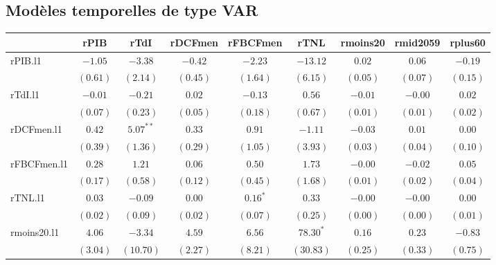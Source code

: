 \documentclass[11pt,]{article}
\begin{document}
\FloatBarrier

\hypertarget{modeles-temporelles-de-type-var}{%
\subsection{Modèles temporelles de type
VAR}\label{modeles-temporelles-de-type-var}}

\FloatBarrier

\begin{table}[!htbp]
\begin{center}
\begin{tabular}{l c c c c c c c c }
\hline
 & rPIB & rTdI & rDCFmen & rFBCFmen & rTNL & rmoins20 & rmid2059 & rplus60 \\
\hline
rPIB.l1     & $-1.05$  & $-3.38$     & $-0.42$    & $-2.23$    & $-13.12$    & $0.02$   & $0.06$      & $-0.19$       \\
            & $(0.61)$ & $(2.14)$    & $(0.45)$   & $(1.64)$   & $(6.15)$    & $(0.05)$ & $(0.07)$    & $(0.15)$      \\
rTdI.l1     & $-0.01$  & $-0.21$     & $0.02$     & $-0.13$    & $0.56$      & $-0.01$  & $-0.00$     & $0.02$        \\
            & $(0.07)$ & $(0.23)$    & $(0.05)$   & $(0.18)$   & $(0.67)$    & $(0.01)$ & $(0.01)$    & $(0.02)$      \\
rDCFmen.l1  & $0.42$   & $5.07^{**}$ & $0.33$     & $0.91$     & $-1.11$     & $-0.03$  & $0.01$      & $0.00$        \\
            & $(0.39)$ & $(1.36)$    & $(0.29)$   & $(1.05)$   & $(3.93)$    & $(0.03)$ & $(0.04)$    & $(0.10)$      \\
rFBCFmen.l1 & $0.28$   & $1.21$      & $0.06$     & $0.50$     & $1.73$      & $-0.00$  & $-0.02$     & $0.05$        \\
            & $(0.17)$ & $(0.58)$    & $(0.12)$   & $(0.45)$   & $(1.68)$    & $(0.01)$ & $(0.02)$    & $(0.04)$      \\
rTNL.l1     & $0.03$   & $-0.09$     & $0.00$     & $0.16^{*}$ & $0.33$      & $-0.00$  & $-0.00$     & $0.00$        \\
            & $(0.02)$ & $(0.09)$    & $(0.02)$   & $(0.07)$   & $(0.25)$    & $(0.00)$ & $(0.00)$    & $(0.01)$      \\
rmoins20.l1 & $4.06$   & $-3.34$     & $4.59$     & $6.56$     & $78.30^{*}$ & $0.16$   & $0.23$      & $-0.83$       \\
            & $(3.04)$ & $(10.70)$   & $(2.27)$   & $(8.21)$   & $(30.83)$   & $(0.25)$ & $(0.33)$    & $(0.75)$      \\

\end{tabular}
\end{center}
\end{table}
\end{document}
